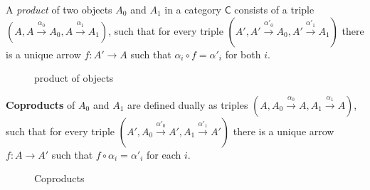 \begin{df}
	A \textit{product} of two objects $A_0$ and $A_1$ in a category $\mathsf{C}$ consists of a triple 
	$(A, A \xrightarrow{\alpha_0} A_0, A \xrightarrow{\alpha_1} A_1)$, 
	such that for every triple 
	$(A', A' \xrightarrow{\alpha'_0} A_0, A' \xrightarrow{\alpha'_1} A_1)$ there is a unique arrow $f \colon A' \to A$ such that $\alpha_i \circ f = \alpha'_i$ for both $i$.


	\begin{figure}[h]
		\centering
		\caption{product of objects}
		\label{fig: product-of-objects}
	\end{figure}
	
	\textbf{Coproducts} of $A_0$ and $A_1$ are defined dually as triples $(A, A_0 \xrightarrow{\alpha_0} A, A_1 \xrightarrow{\alpha_1} A)$, 
	such that for every triple 
	$(A', A_0 \xrightarrow{\alpha'_0} A', A_1 \xrightarrow{\alpha'_1} A')$ there is a unique arrow $f \colon A \to A'$ such that $f \circ \alpha_i  = \alpha'_i$ for each $i$. 
	\begin{figure}[h]
		\centering
		\caption{Coproducts}
		\label{fig: coproducts}
	\end{figure}
\end{df}




